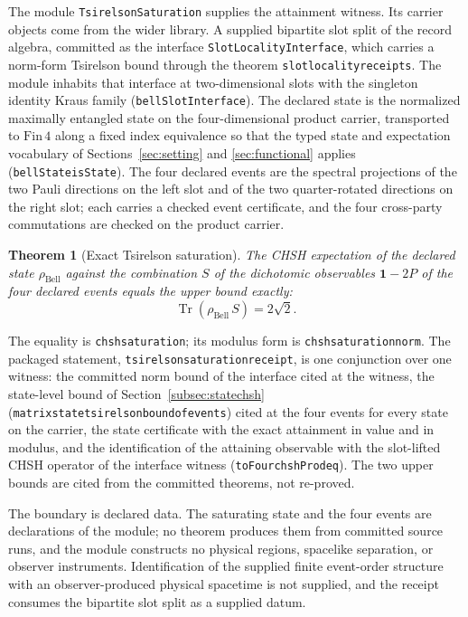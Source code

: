 \documentclass[11pt]{article}
\renewcommand{\_}{\textunderscore\allowbreak}
\newtheorem{theorem}{Theorem}
\theoremstyle{remark}
\newcommand{\Tr}{\operatorname{Tr}}
\newcommand{\one}{\mathbf 1}
\begin{document}
The module \texttt{TsirelsonSaturation} supplies the attainment
witness. Its carrier objects come from the wider library. A supplied
bipartite slot split of the record algebra, committed as the interface
\texttt{SlotLocalityInterface}, which carries a norm-form Tsirelson bound
through the theorem \texttt{slot\_locality\_receipts}. The module inhabits
that interface at two-dimensional slots with the singleton identity Kraus
family (\texttt{bellSlotInterface}). The declared state is the normalized
maximally entangled state on the four-dimensional product carrier,
transported to $\mathrm{Fin}\,4$ along a fixed index equivalence so that
the typed state and expectation vocabulary of
Sections~\ref{sec:setting} and \ref{sec:functional} applies
(\texttt{bellState\_isState}). The four declared events are the spectral
projections of the two Pauli directions on the left slot and of the two
quarter-rotated directions on the right slot; each carries a checked event
certificate, and the four cross-party commutations are checked on the
product carrier.

\begin{theorem}[Exact Tsirelson saturation]
\label{thm:saturation}
The CHSH expectation of the declared state $\rho_{\mathrm{Bell}}$ against
the combination $S$ of the dichotomic observables $\one-2P$ of the four
declared events equals the upper bound exactly:
\[
 \Tr(\rho_{\mathrm{Bell}}\,S)=2\sqrt2 .
\]
\end{theorem}

The equality is \texttt{chsh\_saturation}; its modulus form is
\texttt{chsh\_saturation\_norm}. The packaged statement,
\texttt{tsirelson\_saturation\_receipt}, is one conjunction over one
witness: the committed norm bound of the interface cited at the witness,
the state-level bound of Section~\ref{subsec:statechsh}
(\texttt{matrix\_state\_tsirelson\_bound\_of\_events}) cited at the four
events for every state on the carrier, the state certificate with the
exact attainment in value and in modulus, and the identification of the
attaining observable with the slot-lifted CHSH operator of the interface
witness (\texttt{toFour\_chshProd\_eq}). The two upper bounds are cited
from the committed theorems, not re-proved.

The boundary is declared data. The saturating state and the four events
are declarations of the module; no theorem produces them from committed
source runs, and the module constructs no physical regions, spacelike
separation, or observer instruments. Identification of the supplied finite event-order structure with an
observer-produced physical spacetime is not supplied, and the receipt consumes the
bipartite slot split as a supplied datum.
\end{document}
